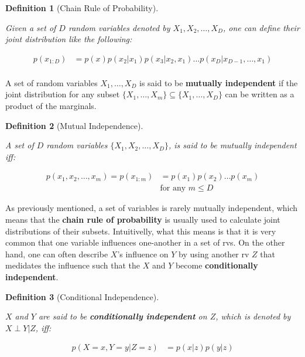 \documentclass{article}
\newtheorem{definition}{Definition}[section]
\begin{document}
\begin{definition}[Chain Rule of Probability]
	\label{def:cahin_rule_prob}
	
	Given a set of $D$ random variables denoted by $X_1, X_2, \hdots, X_D$, one can define their joint distribution like the following:
	
	\begin{align}
		p(x_{1:D}) &= p(x)p(x_2|x_1)p(x_3| x_2, x_1)\hdots p(x_D|x_{D-1}, \hdots, x_1)\\
	\end{align}
	
\end{definition}

A set of random variables $X_1, \hdots, X_D$ is said to be \textbf{mutually independent} if the joint distribution for any subset $\{X_1, \hdots, X_m\}\subseteq \{X_1, \hdots, X_D\}$ can be written as a product of the marginals.

\begin{definition}[Mutual Independence]
	\label{def:mututal_indep}
	
	A set of $D$ random variables $\{X_1, X_2, \hdots, X_D\}$, is said to be mutually independent iff:
	
	\begin{align}
		p(x_1, x_2, \hdots, x_m) = p(x_{1:m}) &= p(x_1)p(x_2)\hdots p(x_m)\\
		&\text{for any  } m \leq D
	\end{align}
	
\end{definition}

As previously mentioned, a set of variables is rarely mutually independent, which means that the \textbf{chain rule of probability} is usually used to calculate joint distributions of their subsets. Intuitivelly, what this means is that it is very common that one variable influences one-another in a set of rvs. On the other hand, one can often describe $X$'s influence on $Y$ by using another rv $Z$ that medidates the influence such that the $X$ and $Y$  become \textbf{conditionally independent}.

\begin{definition}[Conditional Independence]
	\label{def:cond_indep}
	
	$X$ and $Y$ are said to be \textbf{conditionally independent} on $Z$, which is denoted by $X \perp Y | Z$, iff:
	
	\begin{align}
		p(X = x, Y=y | Z = z) &= p(x | z) p(y | z)
	\end{align}
	
\end{definition}
\end{document}
